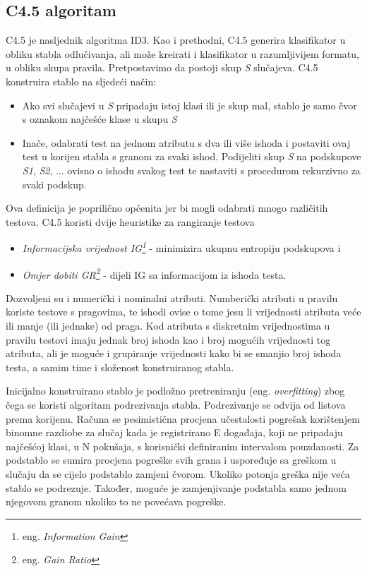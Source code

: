 \subsection{C4.5 algoritam}

C4.5 je nasljednik algoritma ID3. Kao i prethodni, C4.5 generira klasifikator u obliku stabla odlučivanja, ali može 
kreirati i klasifikator u razumljivijem formatu, u obliku skupa pravila. Pretpostavimo da postoji skup \textit{S} 
slučajeva. C4.5 konstruira stablo na sljedeći način:
\begin{itemize}
   \item Ako svi slučajevi u \textit{S} pripadaju istoj klasi ili je skup mal, stablo je samo čvor s oznakom najčešće klase u skupu \textit{S}
   \item Inače, odabrati test na jednom atributu s dva ili više ishoda i postaviti ovaj test u korijen stabla s granom za svaki ishod. Podijeliti skup \textit{S} na podskupove \textit{S1}, \textit{S2}, ... ovisno o ishodu svakog test te nastaviti s procedurom rekurzivno za svaki podskup.
\end{itemize}
Ova definicija je poprilično općenita jer bi mogli odabrati mnogo različitih testova. C4.5 koristi dvije heuristike za rangiranje testova
\begin{itemize}
   \item \textit{Informacijska vrijednost IG\footnote{eng. \textit{Information Gain}}}  - minimizira ukupnu entropiju podskupova i
   \item \textit{Omjer dobiti GR\footnote{eng. \textit{Gain Ratio}}} - dijeli IG sa informacijom iz ishoda testa.
\end{itemize}

Dozvoljeni su i numerički i nominalni atributi. Numberički atributi u pravilu koriste testove s pragovima, te ishodi
ovise o tome jesu li vrijednosti atributa veće ili manje (ili jednake) od praga. Kod atributa s diskretnim vrijednostima
u pravilu testovi imaju jednak broj ishoda kao i broj mogućih vrijednosti tog atributa, ali je moguće i grupiranje 
vrijednosti kako bi se smanjio broj ishoda testa, a samim time i složenost konstruiranog stabla.

Inicijalno konstruirano stablo je podložno pretreniranju (eng. \textit{overfitting}) zbog čega se koristi algoritam podrezivanja stabla. Podrezivanje se odvija od listova prema korijenu. Računa se pesimistična procjena učestalosti pogrešak korištenjem binomne razdiobe za slučaj kada je registrirano E događaja, koji ne pripadaju najčešćoj klasi, u N pokušaja, s korisnički definiranim intervalom pouzdanosti. Za podstablo se sumira procjena pogreške svih grana i uspoređuje sa greškom u slučaju da se cijelo podstablo zamjeni čvorom. Ukoliko potonja greška nije veća stablo se podrezuje. Također, moguće je zamjenjivanje podstabla samo jednom njegovom granom ukoliko to ne povećava pogreške\cite{Wu01}.

